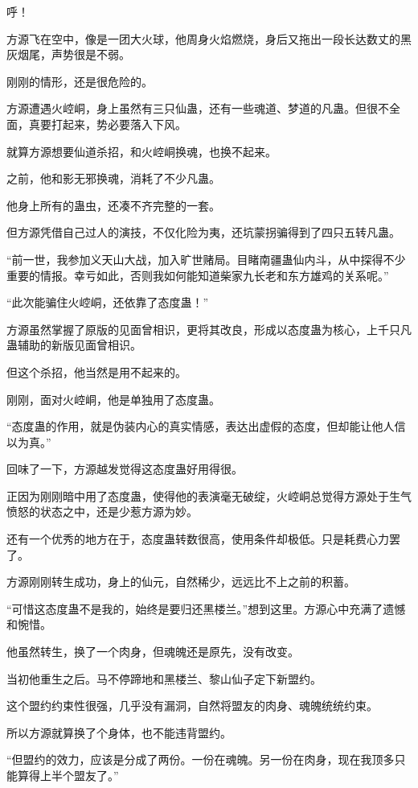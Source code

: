 
\begin{this_body}

呼！

方源飞在空中，像是一团大火球，他周身火焰燃烧，身后又拖出一段长达数丈的黑灰烟尾，声势很是不弱。

刚刚的情形，还是很危险的。

方源遭遇火崆峒，身上虽然有三只仙蛊，还有一些魂道、梦道的凡蛊。但很不全面，真要打起来，势必要落入下风。

就算方源想要仙道杀招，和火崆峒换魂，也换不起来。

之前，他和影无邪换魂，消耗了不少凡蛊。

他身上所有的蛊虫，还凑不齐完整的一套。

但方源凭借自己过人的演技，不仅化险为夷，还坑蒙拐骗得到了四只五转凡蛊。

“前一世，我参加义天山大战，加入旷世赌局。目睹南疆蛊仙内斗，从中探得不少重要的情报。幸亏如此，否则我如何能知道柴家九长老和东方雄鸡的关系呢。”

“此次能骗住火崆峒，还依靠了态度蛊！”

方源虽然掌握了原版的见面曾相识，更将其改良，形成以态度蛊为核心，上千只凡蛊辅助的新版见面曾相识。

但这个杀招，他当然是用不起来的。

刚刚，面对火崆峒，他是单独用了态度蛊。

“态度蛊的作用，就是伪装内心的真实情感，表达出虚假的态度，但却能让他人信以为真。”

回味了一下，方源越发觉得这态度蛊好用得很。

正因为刚刚暗中用了态度蛊，使得他的表演毫无破绽，火崆峒总觉得方源处于生气愤怒的状态之中，还是少惹方源为妙。

还有一个优秀的地方在于，态度蛊转数很高，使用条件却极低。只是耗费心力罢了。

方源刚刚转生成功，身上的仙元，自然稀少，远远比不上之前的积蓄。

“可惜这态度蛊不是我的，始终是要归还黑楼兰。”想到这里。方源心中充满了遗憾和惋惜。

他虽然转生，换了一个肉身，但魂魄还是原先，没有改变。

当初他重生之后。马不停蹄地和黑楼兰、黎山仙子定下新盟约。

这个盟约约束性很强，几乎没有漏洞，自然将盟友的肉身、魂魄统统约束。

所以方源就算换了个身体，也不能违背盟约。

“但盟约的效力，应该是分成了两份。一份在魂魄。另一份在肉身，现在我顶多只能算得上半个盟友了。”


\end{this_body}
